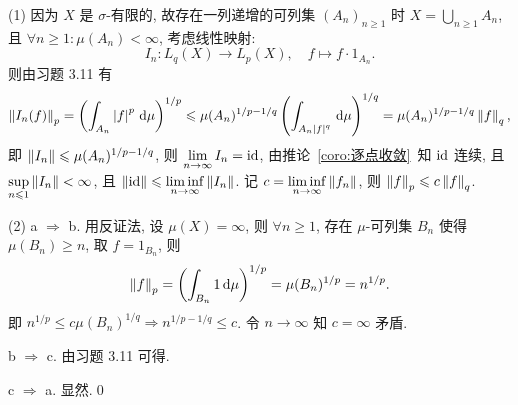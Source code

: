 	\begin{Proof}
		(1) 因为 $ X $ 是 $ \sigma $-有限的, 故存在一列递增的可列集 $ (A_{n})_{n\geqslant1} $ 时 $ X=\bigcup_{n\geqslant1}A_{n} $, 且 $ \forall n\geqslant1:\mu(A_{n})<\infty $, 考虑线性映射:
		\[
			I_{n}: L_{q}(X)\to L_{p}(X), \quad f\mapsto f\cdot 1_{A_{n}}.
		\] 
		则由习题 3.11 有
		\[
			\left\| I_{n}(f) \right\|_{p}=\left( \int_{A_{n}}\left| f \right| ^{p}\,\mathrm{d}\mu \right)^{1/p}\leqslant \mu(A_{n})^{1/p-1/q}\left( \int_{A_{n}\left| f \right| ^{q}}\,\mathrm{d}\mu \right)^{1/q}=\mu(A_{n})^{1/p-1/q}\left\| f \right\|_{q},
		\]
		即 $ \left\| I_{n} \right\|\leqslant\mu(A_{n})^{1/p-1/q} $, 则 $ \lim\limits_{n\to\infty}I_{n}=\mathrm{id} $, 由推论~\ref{coro:逐点收敛}~知 $ \mathrm{id} $ 连续, 且 $ \sup\limits_{n\leqslant1}\left\| I_{n} \right\|<\infty $, 且 $ \left\| \mathrm{id} \right\|\leqslant\liminf\limits_{n\to\infty}\left\| I_{n} \right\| $. 记 $ c=\liminf\limits_{n\to\infty}\left\| f_{n} \right\| $, 则 $ \left\| f \right\|_{p}\leqslant c\left\| f \right\|_{q} $.
		
		(2) a $ \Rightarrow $ b. 用反证法, 设 $ \mu(X)=\infty $, 则 $ \forall n\geqslant1 $, 存在 $ \mu $-可列集 $ B_{n} $ 使得 $ \mu(B_{n})\geqslant n $, 取 $ f = 1_{B_{n}} $, 则
		\[
			\left\| f \right\|_{p}=\left( \int_{B_{n}}1\,\mathrm{d}\mu \right)^{1/p}=\mu(B_{n})^{1/p}=n^{1/p}.
		\]
		即 $ n^{1/p}\leqslant c\mu(B_{n})^{1/q}\Longrightarrow n^{1/p-1/q}\leqslant c $. 令 $ n\to \infty $ 知 $ c=\infty $ 矛盾.

		b $ \Rightarrow $ c. 由习题 3.11 可得.

		c $ \Rightarrow $ a. 显然.\qed
	\end{Proof}